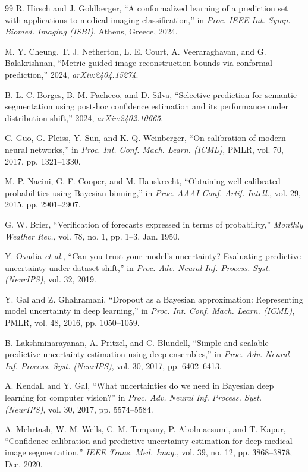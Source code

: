 \documentclass[journal]{IEEEtran}
\begin{document}
\begin{thebibliography}{99}
 R. Hirsch and J. Goldberger, ``A conformalized learning of a prediction set with applications to medical imaging classification,'' in \emph{Proc. IEEE Int. Symp. Biomed. Imaging (ISBI)}, Athens, Greece, 2024.

 M. Y. Cheung, T. J. Netherton, L. E. Court, A. Veeraraghavan, and G. Balakrishnan, ``Metric-guided image reconstruction bounds via conformal prediction,'' 2024, \emph{arXiv:2404.15274}.

 B. L. C. Borges, B. M. Pacheco, and D. Silva, ``Selective prediction for semantic segmentation using post-hoc confidence estimation and its performance under distribution shift,'' 2024, \emph{arXiv:2402.10665}.

 C. Guo, G. Pleiss, Y. Sun, and K. Q. Weinberger, ``On calibration of modern neural networks,'' in \emph{Proc. Int. Conf. Mach. Learn. (ICML)}, PMLR, vol. 70, 2017, pp. 1321--1330.

 M. P. Naeini, G. F. Cooper, and M. Hauskrecht, ``Obtaining well calibrated probabilities using Bayesian binning,'' in \emph{Proc. AAAI Conf. Artif. Intell.}, vol. 29, 2015, pp. 2901--2907.

 G. W. Brier, ``Verification of forecasts expressed in terms of probability,'' \emph{Monthly Weather Rev.}, vol. 78, no. 1, pp. 1--3, Jan. 1950.

 Y. Ovadia \emph{et al.}, ``Can you trust your model's uncertainty? Evaluating predictive uncertainty under dataset shift,'' in \emph{Proc. Adv. Neural Inf. Process. Syst. (NeurIPS)}, vol. 32, 2019.

 Y. Gal and Z. Ghahramani, ``Dropout as a Bayesian approximation: Representing model uncertainty in deep learning,'' in \emph{Proc. Int. Conf. Mach. Learn. (ICML)}, PMLR, vol. 48, 2016, pp. 1050--1059.

 B. Lakshminarayanan, A. Pritzel, and C. Blundell, ``Simple and scalable predictive uncertainty estimation using deep ensembles,'' in \emph{Proc. Adv. Neural Inf. Process. Syst. (NeurIPS)}, vol. 30, 2017, pp. 6402--6413.

 A. Kendall and Y. Gal, ``What uncertainties do we need in Bayesian deep learning for computer vision?'' in \emph{Proc. Adv. Neural Inf. Process. Syst. (NeurIPS)}, vol. 30, 2017, pp. 5574--5584.

 A. Mehrtash, W. M. Wells, C. M. Tempany, P. Abolmaesumi, and T. Kapur, ``Confidence calibration and predictive uncertainty estimation for deep medical image segmentation,'' \emph{IEEE Trans. Med. Imag.}, vol. 39, no. 12, pp. 3868--3878, Dec. 2020.


\end{thebibliography}
\end{document}
